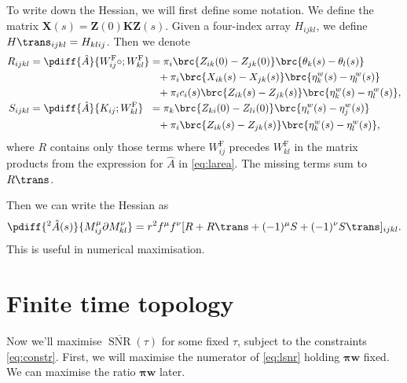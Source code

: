 \documentclass[12pt]{article}
\newcommand{\eqm}{\pi}
\newcommand{\eq}{\boldsymbol{\eqm}}
\newcommand{\fundm}{Z}
\newcommand{\fund}{\mathbf{\fundm}}
\newcommand{\etwm}{\eta^w}
\newcommand{\thbm}{\theta}
\newcommand{\wm}{w}
\newcommand{\w}{\mathbf{\wm}}
\newcommand{\Wm}{W}
\newcommand{\MMdm}{M}
\newcommand{\encm}{K}
\newcommand{\enc}{\mathbf{\encm}}
\newcommand{\frgm}{\Wm^{\mathrm{F}}}
\DeclareMathOperator{\snr}{SNR}
\newcommand{\snrb}{\overline{\snr}}
\begin{document}
To write down the Hessian, we will first define some notation.
We define the matrix \(\mathbf{X}(s) = \fund(0) \enc \fund(s)\).
Given a four-index array \(H_{ijkl}\), we define \(H\trans_{ijkl} = H_{klij}\).
Then we denote
%
\begin{equation}\label{eq:hessparts}
\begin{alignedat}{2}
    R_{ijkl} &= \smash{\pdiff{\hat{A}}{\frgm_{ij} \circ ; \frgm_{kl}}} &
    &=
    \eqm_i \brc{\fundm_{ik}(0) - \fundm_{jk}(0)} \brc{\thbm_k(s) - \thbm_l(s)} \\
    &&&\hphantom{=} {}
    + \eqm_i \brc{{X}_{ik}(s) - {X}_{jk}(s)} 
          \brc{\etwm_k(s) - \etwm_l(s)} \\
    &&& \hphantom{=} {}
    + \eqm_i {c}_i(s) \brc{\fundm_{ik}(s) - \fundm_{jk}(s)} 
          \brc{\etwm_k(s) - \etwm_l(s)},  \\
  S_{ijkl} &= \smash{\pdiff{\hat{A}}{\encm_{ij} ; \frgm_{kl}} } &
  &= \eqm_k \brc{\fundm_{ki}(0) - \fundm_{li}(0)} \brc{\etwm_i(s) - \etwm_j(s)} \\
    &&& \hphantom{=} {}
    + \eqm_i \brc{\fundm_{ik}(s) - \fundm_{jk}(s)} \brc{\etwm_k(s) - \etwm_l(s)},
\end{alignedat}
\end{equation}
%
where \(R\) contains only those terms where \( \frgm_{ij} \) precedes \( \frgm_{kl} \) in the matrix products from the expression for \( \hat{A} \) in \cref{eq:larea}.
The missing terms sum to \(R\trans\).

Then we can write the Hessian as
%
\begin{equation}\label{eq:hessian}
  \pdiff{^2\hat{A}(s)}{\MMdm^\mu_{ij} \partial \MMdm^\nu_{kl}} =
     r^2 f^\mu f^\nu [R + R\trans + (-1)^\mu S + (-1)^\nu S\trans]_{ijkl}.
\end{equation}
%
This is useful in numerical maximisation.


\section{Finite time topology}\label{sec:finite}

Now we'll maximise \(\snrb(\tau)\) for some fixed \(\tau\), subject to the constraints \eqref{eq:constr}.
First, we will maximise the numerator of \eqref{eq:lsnr} holding \(\eq\w\) fixed.
We can maximise the ratio \wrt \(\eq\w\) later.
\end{document}
